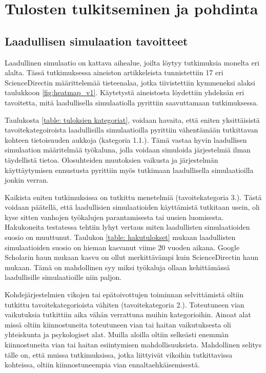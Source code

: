 \documentclass[utf8]{gradu3}
\begin{document}
\chapter{Tulosten tulkitseminen ja pohdinta} \label{tulkitseminen ja pohdinta}

\section{Laadullisen simulaation tavoitteet}
Laadullinen simulaatio on kattava aihealue, joilta löytyy tutkimuksia monelta eri alalta.
Tässä tutkimuksessa aineiston artikkeleista tunnistettiin 17 
eri ScienceDirectin määrittelemää tieteenalaa, 
jotka tiivistettiin kymmeneksi alaksi taulukkoon 
\ref{fig:heatmap_v1}.
Käytetystä aineistosta löydettiin yhdeksän eri tavoitetta, 
mitä laadullisella simulaatiolla pyrittiin saavuttamaan tutkimuksessa.

Taulukosta \ref{table: tuloksien kategoriat}, voidaan havaita, 
että eniten yksittäisistä tavoitekategoiroista 
laadullisilla simulaatioilla pyrittiin vähentämään tutkittavan 
kohteen tietoisuuden aukkoja (kategoria 1.1.). 
Tämä vastaa hyvin laadullisen simulaation määritelmää
työkaluna, jolla voidaan simuloida järjestelmiä ilman täydellistä tietoa.
Olosuhteiden muutoksien vaikusta ja järjestelmän käyttäytymisen ennustusta
pyrittiin myös tutkimaan laadullisella simulaatioilla jonkin verran.

Kaikista eniten tutkimuksissa on tutkittu menetelmiä (tavoitekategoria 3.).
Tästä voidaan päätellä, että laadullisien simulaatioiden käyttämistä 
tutkitaan usein, oli kyse sitten vanhojen työkalujen parantamisesta tai 
uusien luomisesta. 
Hakukoneita testatessa tehtiin lyhyt vertaus miten laadullisten simulaatioiden suosio on 
muuttunut. Taulukon \ref{table: hakutulokset} mukaan laadullisten simulaatioiden 
suosio on hieman kasvanut viime 20 vuoden aikana. Google Scholarin haun mukaan kasvu on ollut
merkittävämpi kuin ScienceDirectin haun mukaan.
Tämä on mahdollinen syy miksi työkaluja ollaan kehittämässä laadullisille simulaatioille
niin paljon.

Kohdejärjestelmien vikojen tai epätoivottujen toiminnan selvittämistä 
oltiin tutkittu tavoitekategorioista vähiten (tavoitekategoria 2.).
Toteutuneen vian vaikutuksia tutkittiin aika vähän 
verrattuna muihin kategorioihin. 
Ainoat alat missä oltiin kiinnostuneita toteutuneen vian tai haitan vaikutuksesta
oli yhteiskunta ja psykologiset alat. 
Muilla aloilla oltiin selkeästi enemmän kiinnostuneita
vian tai haitan esiintymisen mahdollisuuksista.
Mahdollinen selitys tälle on, että muissa tutkimuksissa, 
jotka liittyivät vikoihin tutkittavissa kohteissa, 
oltiin kiinnostuneempia vian ennaltaehkäisemisestä.
\end{document}
